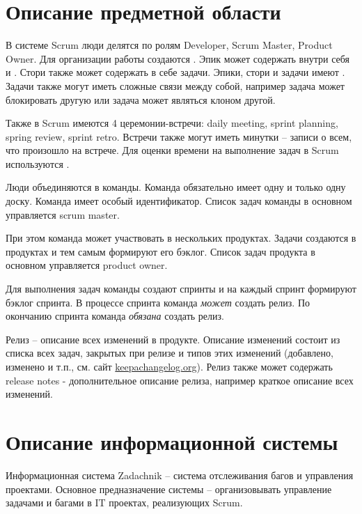 \documentclass[14pt,a4paper]{extarticle}
\begin{document}

\tableofcontents

\section{Описание предметной области}
В системе Scrum люди делятся по ролям
Developer, Scrum Master, Product Owner.
Для организации работы создаются .
Эпик может содержать внутри себя  и
. Стори также может содержать в себе задачи.
Эпики, стори и задачи имеют .
Задачи также могут иметь сложные связи между собой, например
задача может блокировать другую или задача может являться клоном другой.

Также в Scrum имеются 4 церемонии-встречи: daily meeting, sprint
planning, spring review, sprint retro.
Встречи также могут иметь минутки -- записи о всем, что произошло на встрече.
Для оценки времени на выполнение задач в Scrum используются .

Люди объединяются в команды. Команда обязательно имеет одну и только одну доску.
Команда имеет особый идентификатор.
Список задач команды в основном управляется scrum master.

При этом команда может участвовать в нескольких продуктах.
Задачи создаются в продуктах и тем самым формируют его бэклог.
Список задач продукта в основном управляется product owner.

Для выполнения задач команды создают спринты и на каждый
спринт формируют бэклог спринта.
В процессе спринта команда \emph{может} создать релиз.
По окончанию спринта команда \emph{обязана} создать релиз.

Релиз -- описание всех изменений в продукте.
Описание изменений состоит из списка всех задач,
закрытых при релизе и типов этих изменений (добавлено, изменено и т.п., см. сайт \url{keepachangelog.org}).
Релиз также может содержать release notes - дополнительное описание релиза, например
краткое описание всех изменений.

\section{Описание информационной системы}
Информационная система Zadachnik -- система отслеживания багов и
управления проектами.
Основное предназначение системы -- организовывать управление задачами и багами
в IT проектах, реализующих Scrum.
\end{document}
